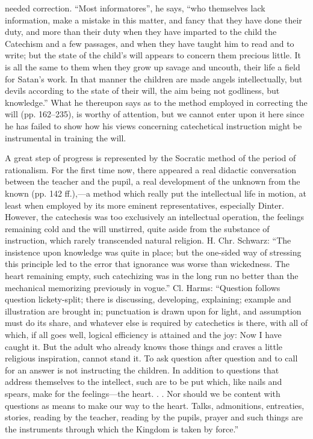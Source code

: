 needed correction. “Most informatores”, he says, “who themselves lack information, make a mistake in this matter, and fancy that they have done their duty, and more than their duty when they have imparted to the child the Catechism and a few passages, and when they have taught him to read and to write; but the state of the child’s will appears to concern them precious little. It is all the same to them when they grow up savage and uncouth, their life a field for Satan’s work. In that manner the children are made angels intellectually, but devils according to the state of their will, the aim being not godliness, but knowledge.” What he thereupon says as to the method employed in correcting the will (pp. 162–235), is worthy of attention, but we cannot enter upon it here since he has failed to show how his views concerning catechetical instruction might be instrumental in training the will.

A great step of progress is represented by the Socratic method of the period of rationalism. For the first time now, there appeared a real didactic conversation between the teacher and the pupil, a real development of the unknown from the known (pp. 142 ff.),—a method which really put the intellectual life in motion, at least when employed by its more eminent representatives, especially Dinter. However, the catechesis was too exclusively an intellectual operation, the feelings remaining cold and the will unstirred, quite aside from the substance of instruction, which rarely transcended natural religion. H. Chr. Schwarz: “The insistence upon knowledge was quite in place; but the one-sided way of stressing this principle led to the error that ignorance was worse than wickedness. The heart remaining empty, such catechizing was in the long run no better than the mechanical memorizing previously in vogue.” Cl. Harms: “Question follows question lickety-split; there is discussing, developing, explaining; example and illustration are brought in; punctuation is drawn upon for light, and assumption must do its share, and whatever else is required by catechetics is there, with all of which, if all goes well, logical efficiency is attained and the joy: Now I have caught it. But the adult who already knows
those things and craves a little religious inspiration, cannot stand it. To ask question after question and to call for an answer is not instructing the children. In addition to questions that address themselves to the intellect, such are to be put which, like nails and spears, make for the feelings—the heart. . . Nor should we be content with questions as means to make our way to the heart. Talks, admonitions, entreaties, stories, reading by the teacher, reading by the pupils, prayer and such things are the instruments through which the Kingdom is taken by force.”

